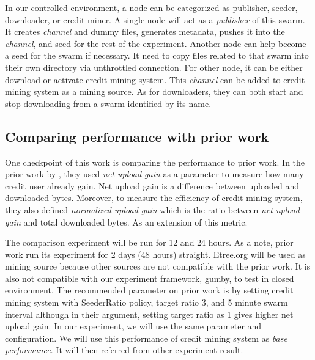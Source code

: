 In our controlled environment, a node can be categorized as publisher, seeder, downloader, or credit miner. A single node will act as a \textit{publisher} of this swarm. It creates \textit{channel} and dummy files, generates metadata, pushes it into the \textit{channel}, and seed for the rest of the experiment. Another node can help become a seed for the swarm if necessary. It need to copy files related to that swarm into their own directory via unthrottled connection. For other node, it can be either download or activate credit mining system. This \textit{channel} can be added to credit mining system as a mining source. As for downloaders, they can both start and stop downloading from a swarm identified by its name. 

\subsection{Comparing performance with prior work}
One checkpoint of this work is comparing the performance to prior work. In the prior work by \citeauthor{2015:creditmining:capota}, they used \textit{net upload gain} as a parameter to measure how many credit user already gain. Net upload gain is a difference between uploaded and downloaded bytes. Moreover, to measure the efficiency of credit mining system, they also defined \textit{normalized upload gain} which is the ratio between \textit{net upload gain} and total downloaded bytes. As an extension of this metric. 

The comparison experiment will be run for 12 and 24 hours. As a note, prior work run its experiment for 2 days (48 hours) straight. Etree.org will be used as mining source because other sources are not compatible with the prior work. It is also not compatible with our experiment framework, gumby, to test in closed environment. The recommended parameter on prior work is by setting credit mining system with SeederRatio policy, target ratio 3, and 5 minute swarm interval although in their argument, setting target ratio as 1 gives higher net upload gain. In our experiment, we will use the same parameter and configuration. We will use this performance of credit mining system as \textit{base performance}. It will then referred from other experiment result. 

